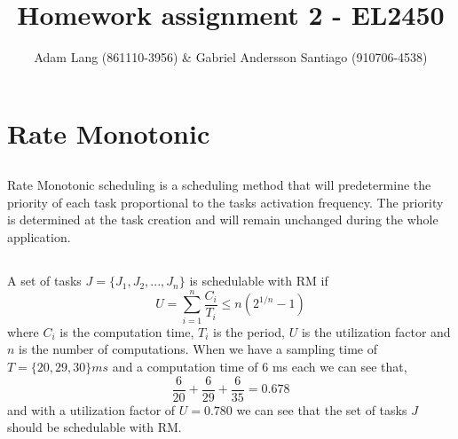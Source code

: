 \documentclass[12pt,a4paper]{article}
\title{Homework assignment 2 - EL2450}
\author{Adam Lang (861110-3956) \& Gabriel Andersson Santiago
(910706-4538)}
\begin{document}
\maketitle
\section{Rate Monotonic} %
\subsection{}
  Rate Monotonic scheduling is a scheduling method that will
  predetermine the priority of each task proportional to the tasks
  activation frequency. The priority is determined at the task creation
  and will remain unchanged during the whole application.

\subsection{} %
  A set of tasks $J=\{J_1,J_2,...,J_n\}$ is schedulable with RM if
  \begin{equation}
    U=\sum\limits_{i=1}^n \frac{C_i}{T_i} \leq n(2^{1/n}-1)
  \end{equation}
  where $C_i$ is the computation time, $T_i$ is the period, $U$ is the
  utilization factor and $n$ is the
  number of computations. When we have a sampling time of 
  $T=\{20, 29, 30\}ms$ and a computation time of 6 ms each we can see that,
  \begin{equation}
    \frac{6}{20}+\frac{6}{29}+\frac{6}{35}=0.678
  \end{equation}
  and with a utilization factor of $U = 0.780$ we can see that the set
  of tasks $J$ should be schedulable with RM.
\end{document}
